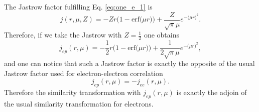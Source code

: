 \documentclass[aip,jcp,reprint,noshowkeys,superscriptaddress]{revtex4-1}
\begin{document}
The Jastrow factor fulfilling Eq. \eqref{eq:one_e_1} is 
\begin{equation}
 \label{eq:one_e_2}
 j(r,\mu,Z) = -Z r \bigg( 1 - \text{erf}\big(\mu r\big) \bigg) + \frac{Z}{\sqrt{\pi}\mu} e^{-\big(\mu r \big)^2}. 
\end{equation}
Therefore, if we take the Jastrow with $Z=\frac{1}{2}$ one obtains 
\begin{equation}
 \label{eq:one_e_3}
 j_{ep}(r,\mu) = -\frac{1}{2} r \bigg( 1 - \text{erf}\big(\mu r\big) \bigg) + \frac{1}{2\sqrt{\pi}\mu} e^{-\big(\mu r \big)^2}, 
\end{equation}
and one can notice that such a Jastrow factor is exactly the opposite of the usual Jastrow factor used for electron-electron correlation  
\begin{equation}
 \label{eq:one_e_4}
 j_{ep}(r,\mu) = -j_{ee}(r,\mu). 
\end{equation}
Therefore the similarity transformation with $j_{ep}(r,\mu)$ is exactly the adjoin of the usual similarity transformation for electrons. 





\end{document}

